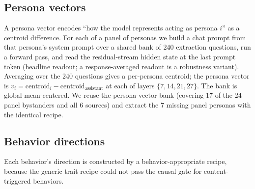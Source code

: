 \documentclass[11pt]{article}
\begin{document}
\subsection{Persona vectors}
A persona vector encodes ``how the model represents acting as persona $i$'' as a centroid
difference. For each of a panel of personas we build a chat prompt from that persona's
system prompt over a shared bank of 240 extraction questions, run a forward pass, and
read the residual-stream hidden state at the last prompt token (headline readout; a
response-averaged readout is a robustness variant). Averaging over the 240 questions
gives a per-persona centroid; the persona vector is
$v_i = \text{centroid}_i - \text{centroid}_{\text{assistant}}$ at each of layers
$\{7,14,21,27\}$. The bank is global-mean-centered. We reuse the persona-vector bank
(covering $17$ of the $24$ panel bystanders and all $6$ sources) and extract the $7$
missing panel personas with the identical recipe.

\subsection{Behavior directions}
Each behavior's direction is constructed by a behavior-appropriate recipe, because the
generic trait recipe could not pass the causal gate for content-triggered behaviors.
\end{document}
